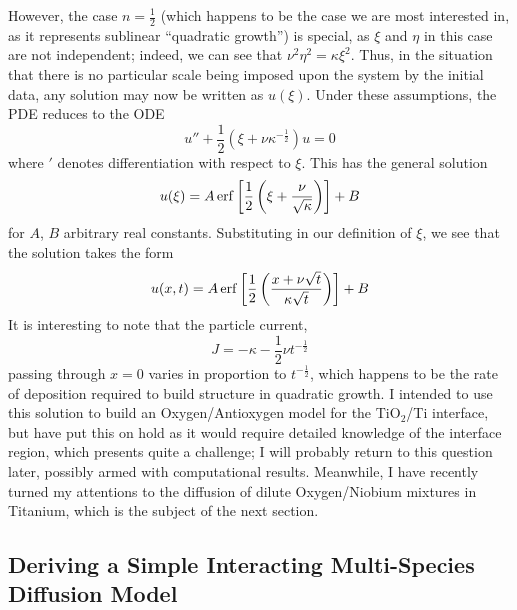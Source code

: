 However, the case $n=\frac{1}{2}$ (which happens to be the case we are most interested in, as it represents sublinear ``quadratic growth'') is special, as $\xi$ and $\eta$ in this case are not independent; indeed, we can see that $\nu^2 \eta^2 = \kappa \xi^2$. Thus, in the situation that there is no particular scale being imposed upon the system by the initial data,  any solution may now be written as $u(\xi)$. Under these assumptions, the PDE reduces to the ODE
\begin{equation}
u'' + \frac{1}{2}\left( \xi + \nu \kappa^{-\frac{1}{2}} \right)u = 0
\end{equation}
where $'$ denotes differentiation with respect to $\xi$. This has the general solution
\begin{equation}
u(\xi) = A \operatorname{erf}{\left[\frac{1}{2}\left(\xi + \frac{\nu}{\sqrt{\kappa}}\right)\right]} + B
\end{equation}
for $A$, $B$ arbitrary real constants. Substituting in our definition of $\xi$, we see that the solution takes the form
\begin{equation}
u(x, t) = A\operatorname{erf}{\left[\frac{1}{2} \left( \frac{x+\nu \sqrt{t}}{\kappa \sqrt{t}} \right)\right]} + B
\end{equation}
It is interesting to note that the particle current,
\begin{equation}
J = -\kappa - \frac{1}{2} \nu t^{-\frac{1}{2}}
\end{equation}
passing through $x=0$ varies in proportion to $t^{-\frac{1}{2}}$, which happens 
to be the rate of deposition required to build structure in quadratic growth.
I intended to use this solution to build an Oxygen/Antioxygen model for the TiO$_2$/Ti interface, but have put this on hold as it would require detailed knowledge of the interface region, which presents quite a challenge; I will 
probably return to this question later, possibly armed with computational 
results. Meanwhile, I have recently turned my attentions to the diffusion of
dilute Oxygen/Niobium mixtures in Titanium, which is the subject of the next 
section.

\subsection{Deriving a Simple Interacting Multi-Species Diffusion Model}





